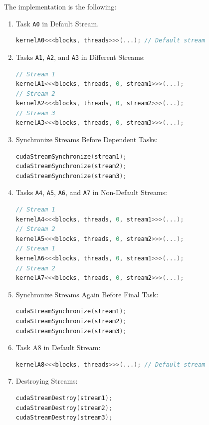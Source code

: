 \begin{examplebox}[: DAG]
    The implementation is the following:
    \begin{enumerate}
        \item Task \texttt{A0} in Default Stream.
        \begin{lstlisting}[language=C++]
kernelA0<<<blocks, threads>>>(...); // Default stream\end{lstlisting}

        \newpage

        \item Tasks \texttt{A1}, \texttt{A2}, and \texttt{A3} in Different Streams:
        \begin{lstlisting}[language=C++]
// Stream 1
kernelA1<<<blocks, threads, 0, stream1>>>(...);
// Stream 2
kernelA2<<<blocks, threads, 0, stream2>>>(...);
// Stream 3
kernelA3<<<blocks, threads, 0, stream3>>>(...);\end{lstlisting}
     
        \item Synchronize Streams Before Dependent Tasks:
        \begin{lstlisting}[language=C++]
cudaStreamSynchronize(stream1);
cudaStreamSynchronize(stream2);
cudaStreamSynchronize(stream3);\end{lstlisting}

        \item Tasks \texttt{A4}, \texttt{A5}, \texttt{A6}, and \texttt{A7} in Non-Default Streams:
        \begin{lstlisting}[language=C++]
// Stream 1
kernelA4<<<blocks, threads, 0, stream1>>>(...);
// Stream 2
kernelA5<<<blocks, threads, 0, stream2>>>(...);
// Stream 1
kernelA6<<<blocks, threads, 0, stream1>>>(...);
// Stream 2
kernelA7<<<blocks, threads, 0, stream2>>>(...);\end{lstlisting}

        \item Synchronize Streams Again Before Final Task:
        \begin{lstlisting}[language=C++]
cudaStreamSynchronize(stream1);
cudaStreamSynchronize(stream2);
cudaStreamSynchronize(stream3);\end{lstlisting}

        \item Task A8 in Default Stream:
        \begin{lstlisting}[language=C++]
kernelA8<<<blocks, threads>>>(...); // Default stream\end{lstlisting}

        \item Destroying Streams:
        \begin{lstlisting}[language=C++]
cudaStreamDestroy(stream1);
cudaStreamDestroy(stream2);
cudaStreamDestroy(stream3);\end{lstlisting}
    \end{enumerate}
\end{examplebox}

